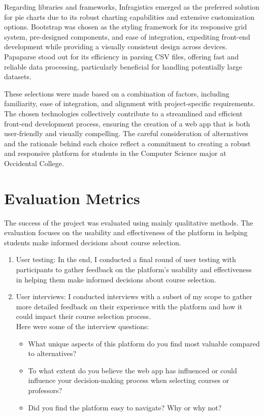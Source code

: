 \documentclass[10pt,twocolumn]{article}
\begin{document}
Regarding libraries and frameworks, Infragistics emerged as the preferred solution for pie charts due to its robust charting capabilities and extensive customization options. Bootstrap was chosen as the styling framework for its responsive grid system, pre-designed components, and ease of integration, expediting front-end development while providing a visually consistent design across devices. Papaparse stood out for its efficiency in parsing CSV files, offering fast and reliable data processing, particularly beneficial for handling potentially large datasets.

These selections were made based on a combination of factors, including familiarity, ease of integration, and alignment with project-specific requirements. The chosen technologies collectively contribute to a streamlined and efficient front-end development process, ensuring the creation of a web app that is both user-friendly and visually compelling. The careful consideration of alternatives and the rationale behind each choice reflect a commitment to creating a robust and responsive platform for students in the Computer Science major at Occidental College.


\section{Evaluation Metrics}

The success of the project was evaluated using mainly qualitative methods. The evaluation focuses on the usability and effectiveness of the platform in helping students make informed decisions about course selection.

\begin{enumerate}
\item User testing: In the end, I conducted a final round of user testing with participants to gather feedback on the platform's usability and effectiveness in helping them make informed decisions about course selection.\\


\item User interviews: I conducted interviews with a subset of my scope to gather more detailed feedback on their experience with the platform and how it could impact their course selection process.\\


Here were some of the interview questions:
\begin{itemize}
\item What unique aspects of this platform do you find most valuable compared to alternatives?
\item To what extent do you believe the web app has influenced or could influence your decision-making process when selecting courses or professors?
\item Did you find the platform easy to navigate? Why or why not?
\end{itemize}
\end{enumerate}
\end{document}
